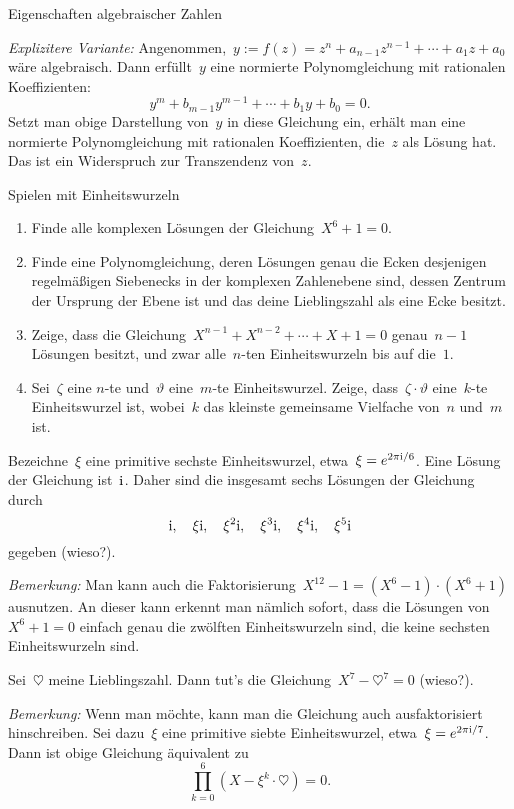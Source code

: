 \documentclass{algblatt}
\begin{document}
\begin{aufgabe}{Eigenschaften algebraischer Zahlen}
\begin{loesungE}
\emph{Explizitere Variante:} Angenommen,~$y := f(z) = z^n + a_{n-1} z^{n-1} + \cdots +
a_1 z + a_0$ wäre algebraisch. Dann erfüllt~$y$ eine normierte Polynomgleichung
mit rationalen Koeffizienten:
\[ y^m + b_{m-1} y^{m-1} + \cdots + b_1 y + b_0 = 0. \]
Setzt man obige Darstellung von~$y$ in diese Gleichung ein, erhält man eine
normierte Polynomgleichung mit rationalen Koeffizienten, die~$z$ als Lösung
hat. Das ist ein Widerspruch zur Transzendenz von~$z$.
\end{loesungE}
\end{aufgabe}

\ifloesungen\newpage\fi
\begin{aufgabe}{Spielen mit Einheitswurzeln}
\begin{enumerate}
\item Finde alle komplexen Lösungen der Gleichung~$X^6 + 1 = 0$.
\item Finde eine Polynomgleichung, deren Lösungen genau die Ecken
desjenigen re\-gel\-mä\-ßi\-gen Siebenecks in der komplexen Zahlenebene sind, dessen Zentrum
der Ursprung der Ebene ist und das deine Lieblingszahl als eine Ecke besitzt.
\item Zeige, dass die Gleichung~$X^{n-1} + X^{n-2} + \cdots + X + 1 = 0$
genau~$n-1$ Lösungen besitzt, und zwar alle~$n$-ten Einheitswurzeln bis auf
die~$1$.
\item Sei~$\zeta$ eine $n$-te und~$\vartheta$ eine~$m$-te Einheitswurzel.
Zeige, dass~$\zeta \cdot \vartheta$ eine~$k$-te Einheitswurzel ist, wobei~$k$
das kleinste gemeinsame Vielfache von~$n$ und~$m$ ist.
\end{enumerate}
\begin{loesungE}
\item Bezeichne~$\xi$ eine primitive sechste Einheitswurzel, etwa~$\xi =
e^{2\pi\mathrm{i} / 6}$. Eine Lösung der Gleichung ist~$\mathrm{i}$. Daher sind die
insgesamt sechs Lösungen der Gleichung durch
\[ \mathrm{i},\quad \xi \mathrm{i},\quad \xi^2 \mathrm{i},\quad \xi^3 \mathrm{i},\quad \xi^4 \mathrm{i},\quad \xi^5 \mathrm{i} \]
gegeben (wieso?).

\emph{Bemerkung:} Man kann auch die Faktorisierung~$X^{12} - 1 = (X^6 - 1)
\cdot (X^6 + 1)$ ausnutzen. An dieser kann erkennt man nämlich sofort, dass
die Lösungen von~$X^6 + 1 = 0$ einfach genau die zwölften Einheitswurzeln sind,
die keine sechsten Einheitswurzeln sind.

\item Sei~$\heartsuit$ meine Lieblingszahl. Dann tut's die Gleichung~$X^7 -
\heartsuit^7 = 0$ (wieso?).

\emph{Bemerkung:} Wenn man möchte, kann man die Gleichung auch ausfaktorisiert
hinschreiben. Sei dazu~$\xi$ eine primitive siebte Einheitswurzel, etwa~$\xi =
e^{2\pi\mathrm{i} / 7}$. Dann ist obige Gleichung äquivalent zu
\[ \prod_{k=0}^6 (X - \xi^k \cdot \heartsuit) = 0. \]


\end{loesungE}
\end{aufgabe}
\end{document}
